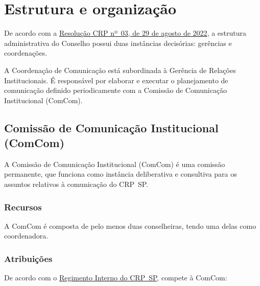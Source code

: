 \chapter{Estrutura e organização}

De acordo com a
\href{https://transparencia.cfp.org.br/crp06/wp-content/uploads/sites/29/2022/09/Resolucao-03-22-PECS-f-1-assinada.pdf}{Resolução
  CRP nº~03, de 29 de agosto de 2022}, a estrutura administrativa do
Conselho possui duas instâncias decisórias: gerências e coordenações.

A Coordenação de Comunicação está subordinada à Gerência de Relações
Institucionais. É responsável por elaborar e executar o planejamento de
comunicação definido periodicamente com a Comissão de Comunicação
Institucional (ComCom).

\section{Comissão de Comunicação Institucional
  (ComCom)}

A Comissão de Comunicação Institucional (ComCom) é uma comissão
permanente, que funciona como instância deliberativa e consultiva para
os assuntos relativos à comunicação do CRP~SP.

\subsection{Recursos}

A ComCom é composta de pelo menos duas conselheiras, tendo uma delas
como coordenadora.

\subsection{Atribuições}

De acordo com o
\href{https://correio.crpsp.org.br/service/home/~/?auth=co&loc=pt_BR&id=4201&part=6}{Regimento
  Interno do CRP~SP}, compete à ComCom:

